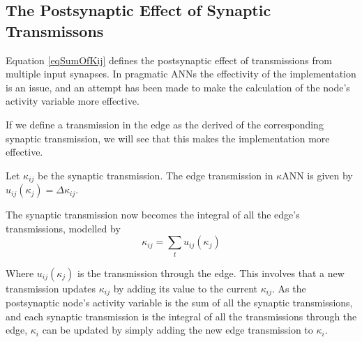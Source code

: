 		

		\subsection{The Postsynaptic Effect of Synaptic Transmissons}
			\label{ssecSynInputToANodeKANN}
			Equation \eqref{eqSumOfKij} defines the postsynaptic effect of transmissions from multiple input synapses.
			In pragmatic ANNs the effectivity of the implementation is an issue, and an attempt has been made to make the calculation of the node's activity variable more effective.
			
			If we define a transmission in the edge as the derived of the corresponding synaptic transmission, we will see that this makes the implementation more effective.
			\begin{mydef}
				Let $\kappa_{ij}$ be the synaptic transmission. The edge transmission in $\kappa$ANN is given by $u_{ij}(\kappa_j) = \Delta \kappa_{ij}$.
			\end{mydef}
			The synaptic transmission now becomes the integral of all the edge's transmissions, modelled by %
			\begin{equation}
				\kappa_{ij} = \sum_t{u_{ij}(\kappa_j)}
				\label{eqSynapticTransmissionAsSumOfEdgeTransmissions}
			\end{equation}
			
			Where $u_{ij}(\kappa_j)$ is the transmission through the edge.
			This involves that a new transmission updates $\kappa_{ij}$ by adding its value to the current $\kappa_{ij}$.
			As the postsynaptic node's activity variable is the sum of all the synaptic transmissions, and each synaptic transmission is the integral of all the transmissions through the edge, 
				$\kappa_i$ can be updated by simply adding the new edge transmission to $\kappa_i$.

